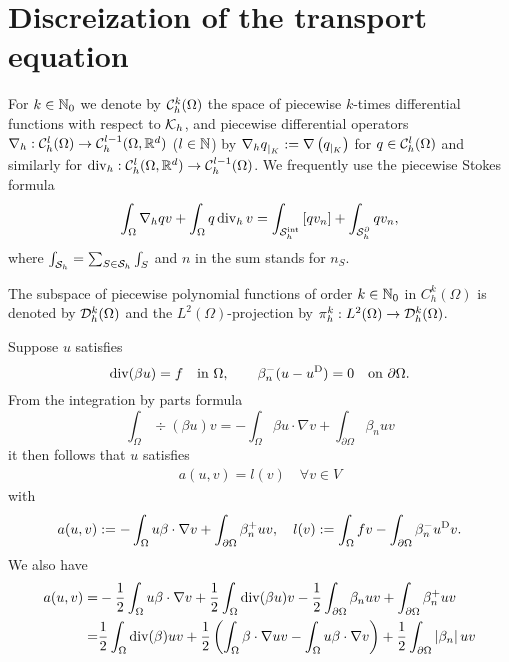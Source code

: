 %
\section{Discreization of the transport equation}\label{sec:}
%
For $k\in\mathbb N_0$ we denote by $\mathcal{C}_h^k(\Omega)$ the space of piecewise $k$-times differential functions with respect to $\mathcal K_h$, and 
piecewise differential operators $\nabla_h:\mathcal{C}_h^l(\Omega)\to \mathcal{C}_h^{l-1}(\Omega,\mathbb R^d)$ ($l\in\mathbb N$) by 
${\nabla_h q}_{|_{K}} := \nabla\left({q}_{|_{K}}\right)$ for $q\in \mathcal{C}_h^l(\Omega)$ and similarly for 
$\operatorname{div}_h: \mathcal{C}_h^{l}(\Omega,\mathbb R^d)\to \mathcal{C}_h^{l-1}(\Omega)$.
We frequently use the piecewise Stokes formula
%
\begin{equation}\label{eq:StokesPiecewise}
\int_{\Omega} \nabla_h q v + \int_{\Omega} q \operatorname{div}_h v = \int_{\mathcal S^{\rm int}_h}\left[q v_n\right] +  \int_{\mathcal S^{\partial}_h}q v_n,
\end{equation}
%
where $\int_{\mathcal S_h}=\sum_{S\in\mathcal S_h}\int_S$ and $n$ in the sum stands for $n_S$.

The subspace of piecewise polynomial functions of order $k\in\mathbb N_0$ in $C^k_h(\Omega)$ is denoted by $\mathcal{D}_h^k(\Omega)$ and the $L^2(\Omega)$-projection by $\pi_h^k:L^2(\Omega)\to\mathcal{D}_h^k(\Omega)$.


Suppose $u$ satisfies
%
\begin{equation}\label{eq:transport}
\operatorname{div}(\beta u) = f\quad\mbox{in $\Omega$},\qquad \beta_n^{-}(u-u^{\rm D}) = 0\quad \mbox{on $\partial\Omega$}.
\end{equation}
%
From the integration by parts formula
%
\begin{equation}\label{eq:}
\int_{\Omega}\div(\beta u ) v  = - \int_{\Omega}\beta u \cdot \nabla v + \int_{\partial\Omega} \beta_n uv
\end{equation}
%
it then follows that $u$ satisfies 
%
\begin{align*}
a(u,v)=l(v)\quad \forall v\in V
\end{align*}
%
with
%
\begin{equation}\label{eq:}
a(u,v) := -\int_{\Omega} u \beta\cdot \nabla v + \int_{\partial\Omega} \beta_n^+ uv,\quad l(v) := \int_{\Omega} fv -\int_{\partial\Omega} \beta_n^- u^{\rm D} v.
\end{equation}
%
We also have
%
\begin{align*}
a(u,v) =& -\frac12\int_{\Omega} u  \beta\cdot\nabla v + \frac12 \int_{\Omega}\operatorname{div}(\beta u ) v - \frac12 \int_{\partial\Omega} \beta_n uv +\int_{\partial\Omega}\beta_n^+ uv\\
=&  \frac12 \int_{\Omega}\operatorname{div}(\beta) u  v +\frac12\left(\int_{\Omega} \beta\cdot\nabla u v-\int_{\Omega} u  \beta\cdot\nabla v\right)
+ \frac12 \int_{\partial\Omega}\left|\beta_n\right|uv
\end{align*}
%

